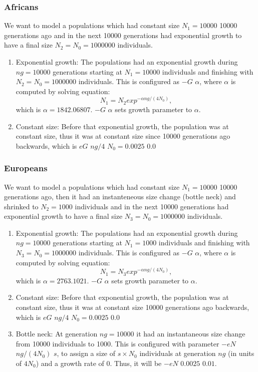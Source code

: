 \documentclass[runningheads]{/home/mabad/conferences/LNCS/llncs}
\begin{document}
\subsubsection{Africans}
We want to model a populations which had constant size $N_1=10000$ 10000 generations ago and in the next 10000 generations had exponential growth to have a final size $N_2=N_0=1000000$ individuals.
\begin{enumerate}
\item Exponential growth: The populations had an exponential growth during $ng=10000$ generations starting at $N_1=10000$ individuals and finishing with $N_2=N_0=1000000$ individuals. This is configured as $-G$ $\alpha$, where $\alpha$ is computed by solving equation:
\[N_1=N_2 exp^{-\alpha ng/(4 N_0)},\]
which is $\alpha=1842.06807$. $-G$ $\alpha$ sets growth parameter to $\alpha$. 
\item Constant size: Before that exponential growth, the population was at constant size, thus it was at constant size since 10000 generations ago backwards, which is $eG$ $ng/4$ $N_0=0.0025$  $0.0$
\end{enumerate}

\subsubsection{Europeans}
We want to model a populations which had constant size $N_1=10000$ 10000 generations ago, then it had an instanteneous size change (bottle neck) and shrinked to $N_2=1000$ individuals and in the next 10000 generations had exponential growth to have a final size $N_3=N_0=1000000$ individuals.
\begin{enumerate}
\item Exponential growth: The populations had an exponential growth during $ng=10000$ generations starting at $N_1=1000$ individuals and finishing with $N_3=N_0=1000000$ individuals. This is configured as $-G$ $\alpha$, where $\alpha$ is computed by solving equation:
\[N_1=N_3 exp^{-\alpha ng/(4 N_0)},\]
which is $\alpha=2763.1021$. $-G$ $\alpha$ sets growth parameter to $\alpha$. 
\item Constant size: Before that exponential growth, the population was at constant size, thus it was at constant size 10000 generations ago backwards, which is $eG$ $ng/4$ $N_0=0.0025$  $0.0$
\item Bottle neck: At generation $ng=10000$ it had an instantaneous size change from 10000 individuals to 1000. This is configured with parameter $-eN$ $ng/(4 N_0)$ $s$, to assign a size of $s\times N_0$ individuals at generation $ng$ (in units of $4N_0$) and a growth rate of $0$. Thus, it will be $-eN$ $0.0025$ $0.01$. 
\end{enumerate}
\end{document}
